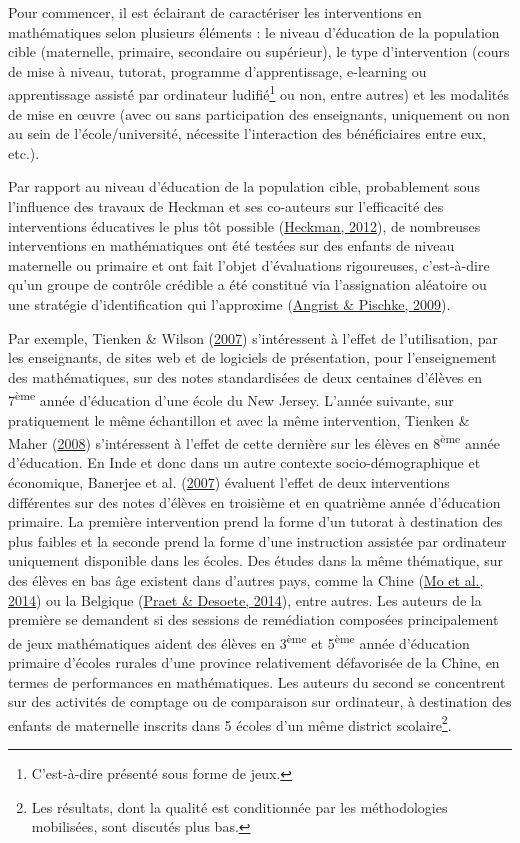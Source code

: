 \documentclass[
]{book}
\begin{document}
Pour commencer, il est éclairant de caractériser les interventions en mathématiques selon plusieurs éléments : le niveau d'éducation de la population cible (maternelle, primaire, secondaire ou supérieur), le type d'intervention (cours de mise à niveau, tutorat, programme d'apprentissage, e-learning ou apprentissage assisté par ordinateur ludifié\footnote{C'est-à-dire présenté sous forme de jeux.} ou non, entre autres) et les modalités de mise en œuvre (avec ou sans participation des enseignants, uniquement ou non au sein de l'école/université, nécessite l'interaction des bénéficiaires entre eux, etc.).

\quad Par rapport au niveau d'éducation de la population cible, probablement sous l'influence des travaux de Heckman et ses co-auteurs sur l'efficacité des interventions éducatives le plus tôt possible (\protect\hyperlink{ref-HEC:12}{Heckman, 2012}), de nombreuses interventions en mathématiques ont été testées sur des enfants de niveau maternelle ou primaire et ont fait l'objet d'évaluations rigoureuses, c'est-à-dire qu'un groupe de contrôle crédible a été constitué via l'assignation aléatoire ou une stratégie d'identification qui l'approxime (\protect\hyperlink{ref-ANG:PIS:08}{Angrist \& Pischke, 2009}).

Par exemple, Tienken \& Wilson (\protect\hyperlink{ref-TIE:WIL:07}{2007}) s'intéressent à l'effet de l'utilisation, par les enseignants, de sites web et de logiciels de présentation, pour l'enseignement des mathématiques, sur des notes standardisées de deux centaines d'élèves en 7\textsuperscript{ème} année d'éducation d'une école du New Jersey. L'année suivante, sur pratiquement le même échantillon et avec la même intervention, Tienken \& Maher (\protect\hyperlink{ref-TIE:MAH:08}{2008}) s'intéressent à l'effet de cette dernière sur les élèves en 8\textsuperscript{ème} année d'éducation. En Inde et donc dans un autre contexte socio-démographique et économique, Banerjee et al. (\protect\hyperlink{ref-BAN:eal:07}{2007}) évaluent l'effet de deux interventions différentes sur des notes d'élèves en troisième et en quatrième année d'éducation primaire. La première intervention prend la forme d'un tutorat à destination des plus faibles et la seconde prend la forme d'une instruction assistée par ordinateur uniquement disponible dans les écoles. Des études dans la même thématique, sur des élèves en bas âge existent dans d'autres pays, comme la Chine (\protect\hyperlink{ref-MO:eal:14}{Mo et al., 2014}) ou la Belgique (\protect\hyperlink{ref-PRA:DES:14}{Praet \& Desoete, 2014}), entre autres. Les auteurs de la première se demandent si des sessions de remédiation composées principalement de jeux mathématiques aident des élèves en 3\textsuperscript{ème} et 5\textsuperscript{ème} année d'éducation primaire d'écoles rurales d'une province relativement défavorisée de la Chine, en termes de performances en mathématiques. Les auteurs du second se concentrent sur des activités de comptage ou de comparaison sur ordinateur, à destination des enfants de maternelle inscrits dans 5 écoles d'un même district scolaire\footnote{Les résultats, dont la qualité est conditionnée par les méthodologies mobilisées, sont discutés plus bas.}.
\end{document}

